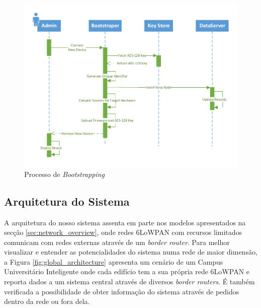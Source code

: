 \documentclass{llncs}
\begin{document}
\begin{figure}[h]
  \centering
  \includegraphics[width=0.95\linewidth]{figures/Sequence_Bootstrapping_Reviewed.pdf}
  \caption{Processo de \textit{Bootstrapping}}
  \label{fig:bootstrapping_process}
\end{figure}

\subsection{Arquitetura do Sistema}
\label{sec:system_architecture}
A arquitetura do nosso sistema assenta em parte nos modelos apresentados na secção \ref{sec:network_overview}, onde redes \ac{6LoWPAN} com recursos limitados comunicam com redes externas através de um \textit{border router}.
Para melhor visualizar e entender as potencialidades do sistema numa rede de maior dimensão, a Figura \ref{fig:global_architecture} apresenta um cenário de um Campus Universitário Inteligente onde cada edifício tem a sua própria rede 6LoWPAN e reporta dados a um sistema central através de diversos \textit{border routers}. É também verificada a possibilidade de obter informação do sistema através de pedidos dentro da rede ou fora dela.
\end{document}
